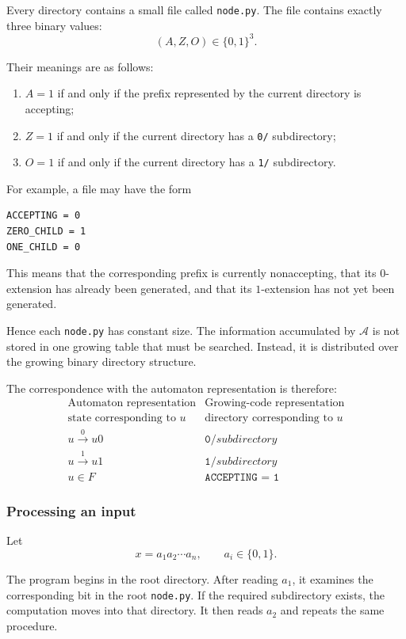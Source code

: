 \documentclass[11pt]{article}
\begin{document}
Every directory contains a small file called \texttt{node.py}.  The file
contains exactly three binary values:
\[
(A,Z,O)\in\{0,1\}^3.
\]

Their meanings are as follows:
\begin{enumerate}[label=(\roman*)]
    \item \(A=1\) if and only if the prefix represented by the current
    directory is accepting;

    \item \(Z=1\) if and only if the current directory has a
    \texttt{0/} subdirectory;

    \item \(O=1\) if and only if the current directory has a
    \texttt{1/} subdirectory.
\end{enumerate}

For example, a file may have the form
\begin{verbatim}
ACCEPTING = 0
ZERO_CHILD = 1
ONE_CHILD = 0
\end{verbatim}

This means that the corresponding prefix is currently nonaccepting, that
its \(0\)-extension has already been generated, and that its
\(1\)-extension has not yet been generated.

Hence each \texttt{node.py} has constant size.  The information accumulated
by \(\mathcal A\) is not stored in one growing table that must be searched.
Instead, it is distributed over the growing binary directory structure.

The correspondence with the automaton representation is therefore:
\[
\begin{array}{c|c}
\text{Automaton representation}
&
\text{Growing-code representation}
\\ \hline
\text{state corresponding to }u
&
\text{directory corresponding to }u
\\
u\xrightarrow{0}u0
&
\texttt{0/} subdirectory
\\
u\xrightarrow{1}u1
&
\texttt{1/} subdirectory
\\
u\in F
&
\texttt{ACCEPTING = 1}
\end{array}
\]

\subsubsection*{Processing an input}

Let
\[
x=a_1a_2\cdots a_n,
\qquad a_i\in\{0,1\}.
\]

The program begins in the root directory.  After reading \(a_1\), it
examines the corresponding bit in the root \texttt{node.py}.  If the
required subdirectory exists, the computation moves into that directory.
It then reads \(a_2\) and repeats the same procedure.
\end{document}
